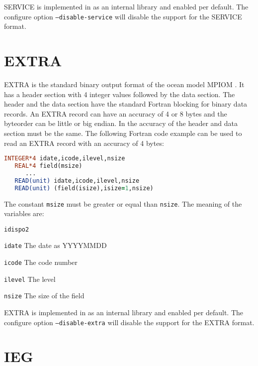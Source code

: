 SERVICE is implemented in {\CDI} as an internal library and enabled per default.
The configure option \texttt{--disable-service} will disable the support for the SERVICE format.

\section{EXTRA}

EXTRA is the standard binary output format of the ocean model MPIOM \cite{MPIOM}.
It has a header section with 4 integer values followed by the data section. 
The header and the data section have the standard Fortran blocking for binary data records.
An EXTRA record can have an accuracy of 4 or 8 bytes and the byteorder can be little or big endian.
In {\CDI} the accuracy of the header and data section must be the same.
The following Fortran code example can be used to read an EXTRA record with an accuracy of 4 bytes:

\begin{lstlisting}[language=Fortran, backgroundcolor=\color{pyellow}, basicstyle=\small, columns=flexible]
   INTEGER*4 idate,icode,ilevel,nsize
   REAL*4 field(msize)
      ...
   READ(unit) idate,icode,ilevel,nsize
   READ(unit) (field(isize),isize=1,nsize)
\end{lstlisting}

The constant \texttt{msize} must be greater or equal than \texttt{nsize}.
The meaning of the variables are:

\vspace*{3mm}
\hspace*{8mm}\begin{minipage}{10cm}
\begin{deflist}{\texttt{idispo2 \ \ }}
\item[\texttt{idate}]    The date as YYYYMMDD
\item[\texttt{icode}]    The code number
\item[\texttt{ilevel}]   The level
\item[\texttt{nsize}]    The size of the field
\end{deflist}
\end{minipage}
\vspace*{3mm}

EXTRA is implemented in {\CDI} as an internal library and enabled per default.
The configure option \texttt{--disable-extra} will disable the support for the EXTRA format.


\section{IEG}

